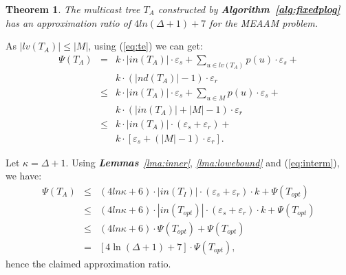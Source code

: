 \documentclass[10pt, conference, compsocconf]{IEEEtran}
\newtheorem{theorem}{\textbf{Theorem}}
\begin{document}
    \begin{theorem}
The multicast tree $T_A$ constructed by \textbf{Algorithm~\ref{alg:fixedplog}} has an approximation ratio of $4ln(\Delta+1)+7$ for the MEAAM problem.
      \label{thm:fixedratio}
\end{theorem}
\begin{IEEEproof}
As $|\mathit{lv}(T_A)|\leq |M|$, using (\ref{eq:te}) we can get:
\begin{eqnarray}
        \Psi(T_A) &=& k \cdot |\mathit{in}(T_A)| \cdot {\varepsilon _s} + \sum\nolimits_{u \in \mathit{lv}(T_A)} {p(u) \cdot } {\varepsilon _s} + \nonumber \\
        && k \cdot (|\mathit{nd}(T_A)| - 1) \cdot {\varepsilon _r} \nonumber \\
        &\le& k \cdot |\mathit{in}(T_A)| \cdot {\varepsilon _s} + \sum\nolimits_{u \in M} {p(u) \cdot } {\varepsilon _s} + \nonumber \\
        && k \cdot (|\mathit{in}(T_A)|+|M| - 1) \cdot {\varepsilon _r} \nonumber \\
        &\le& k \cdot |\mathit{in}(T_A)| \cdot ({\varepsilon _s} +{\varepsilon _r}) + \nonumber \\
        &&  k \cdot \left[\varepsilon _s + (|M| - 1) \cdot \varepsilon _r \right]. \label{eq:interm}
      \end{eqnarray}

      Let $\kappa=\Delta+1$. Using \textit{\textbf{Lemmas}~\ref{lma:inner}}, \textit{\ref{lma:lowebound}} and (\ref{eq:interm}), we have:
\begin{eqnarray}
        \Psi(T_A) \!\!\!&\le&\!\!\! (4ln \kappa + 6) \cdot |\mathit{in}(T_I)| \cdot ({\varepsilon _s} +{\varepsilon _r}) \cdot k + \Psi(T_\mathit{opt}) \nonumber \\
        &\le&\!\!\! (4ln \kappa + 6) \cdot |\mathit{in}(T_\mathit{opt})| \cdot ({\varepsilon _s} +{\varepsilon _r}) \cdot k + \Psi(T_\mathit{opt}) \nonumber \\
        &\le&\!\!\! (4ln \kappa + 6) \cdot \Psi(T_\mathit{opt}) + \Psi(T_\mathit{opt}) \nonumber \\
        &=&\!\!\! \left[4\ln (\Delta+1) + 7\right] \cdot \Psi(T_\mathit{opt}), \nonumber
      \end{eqnarray}
      hence the claimed approximation ratio.
    \end{IEEEproof}
\end{document}
